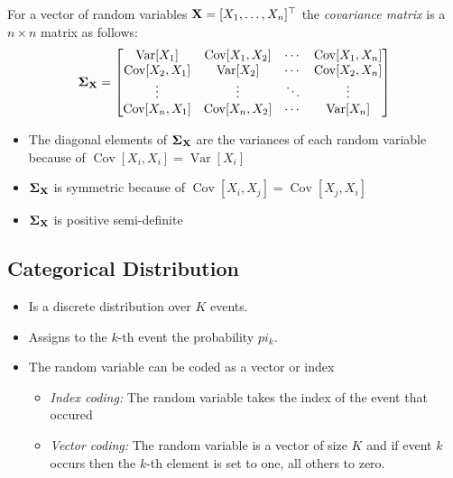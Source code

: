 \begin{definition}
For a vector of random variables \(\boldsymbol{\mathrm{X}} = [X_1, \ldots, X_n]^\top\) the \textit{covariance matrix} is a \(n \times n\) matrix as follows:
\[
\boldsymbol{\mathrm{\Sigma}}_{\boldsymbol{\mathrm{X}}} = \begin{bmatrix}
\operatorname{Var}[X_1] & \operatorname{Cov}[X_1, X_2] & \cdots & \operatorname{Cov}[X_1, X_n]\\
\operatorname{Cov}[X_2, X_1] & \operatorname{Var}[X_2] & \cdots & \operatorname{Cov}[X_2, X_n]\\
\vdots & \vdots & \ddots & \vdots\\
\operatorname{Cov}[X_n, X_1] & \operatorname{Cov}[X_n, X_2] & \cdots & \operatorname{Var}[X_n]
\end{bmatrix}
\]

\begin{itemize}
\item The diagonal elements of \(\boldsymbol{\mathrm{\Sigma}}_{\boldsymbol{\mathrm{X}}}\) are the variances of each random variable because of \(\operatorname{Cov}[X_i, X_i] = \operatorname{Var}[X_i]\)
\item \(\boldsymbol{\mathrm{\Sigma}}_{\boldsymbol{\mathrm{X}}}\) is symmetric because of \(\operatorname{Cov}[X_i, X_j] = \operatorname{Cov}[X_j, X_i]\)
\item \(\boldsymbol{\mathrm{\Sigma}}_{\boldsymbol{\mathrm{X}}}\) is positive semi-definite
\end{itemize}
\end{definition}

\subsection{Categorical Distribution}
\begin{itemize}
\item Is a discrete distribution over \(K\) events.
\item Assigns to the \(k\)-th event the probability \(pi_k\).
\item The random variable can be coded as a vector or index
\begin{itemize}
\item \textit{Index coding:} The random variable takes the index of the event that occured
\item \textit{Vector coding:} The random variable is a vector of size \(K\) and if event \(k\) occurs then the \(k\)-th element is set to one, all others to zero.
\end{itemize}
\end{itemize}

